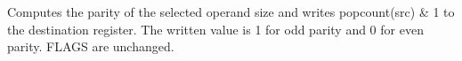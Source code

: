 Computes the parity of the selected operand size and writes popcount(src) \& 1 to the destination register. The written value is 1 for odd parity and 0 for even parity. FLAGS are unchanged.
